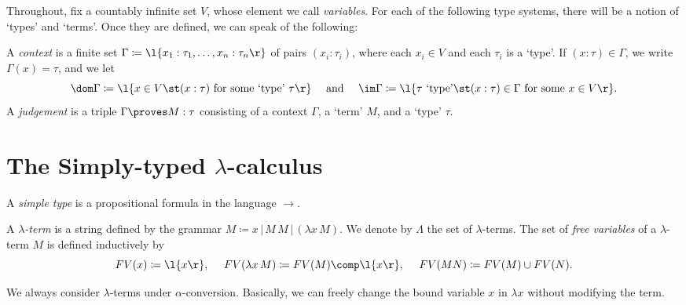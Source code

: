 \documentclass[reqno]{amsart}
\begin{document}
    Throughout, fix a countably infinite set $V$, whose element we call \textit{variables}. For each of the following type systems, there will be a notion of `types' and `terms'. Once they are defined, we can speak of the following:

    \begin{definition*}
        A \textit{context} is a finite set $\Gamma\coloneqq\l\{x_1:\tau_1,\dots,x_n:\tau_n\r\}$ of pairs $(x_i:\tau_i)$, where each $x_i\in V$ and each $\tau_i$ is a `type'. If $(x:\tau)\in\Gamma$, we write $\Gamma(x)=\tau$, and we let
        \begin{equation*}
            \dom\Gamma\coloneqq\l\{x\in V\st(x:\tau)\textrm{ for some `type' }\tau\r\}\ \ \ \ \textrm{and}\ \ \ \ \im\Gamma\coloneqq\l\{\tau\textrm{ `type'}\st(x:\tau)\in\Gamma\textrm{ for some }x\in V\r\}.
        \end{equation*}
        A \textit{judgement} is a triple $\Gamma\proves M:\tau$ consisting of a context $\Gamma$, a `term' $M$, and a `type' $\tau$.
    \end{definition*}

    \section{The Simply-typed $\lambda$-calculus}

    \begin{definition}
        A \textit{simple type} is a propositional formula in the language $\rightarrow$.
    \end{definition}

    \begin{definition}
        A \textit{$\lambda$-term} is a string defined by the grammar $M\coloneqq x\,|\,M\,M\,|\,(\lambda x\,M)$. We denote by $\Lambda$ the set of $\lambda$-terms. The set of \textit{free variables} of a $\lambda$-term $M$ is defined inductively by
        \begin{equation*}
            FV(x)\coloneqq\l\{x\r\},\ \ \ \ FV(\lambda x\,M)\coloneqq FV(M)\comp\l\{x\r\},\ \ \ \ FV(MN)\coloneqq FV(M)\cup FV(N).
        \end{equation*}
    \end{definition}

    \begin{notation}
        We always consider $\lambda$-terms under $\alpha$-conversion. Basically, we can freely change the bound variable $x$ in $\lambda x$ without modifying the term.
    \end{notation}
\end{document}
